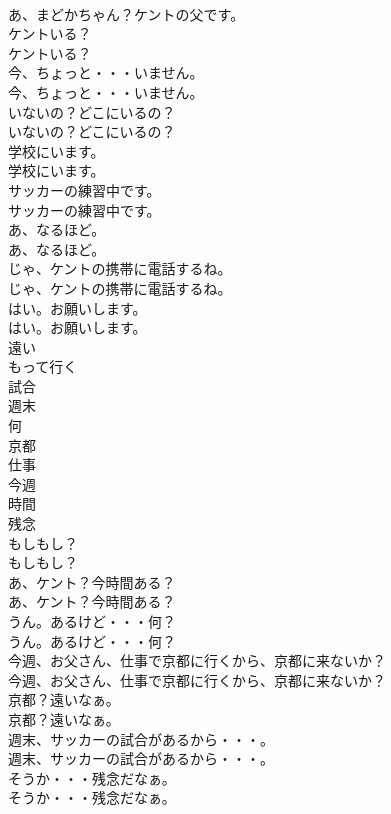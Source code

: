 \documentclass[8pt]{extreport}
\begin{document}
\begin{CJK}{UTF8}{min}
\\	あ、まどかちゃん？ケントの父です。 
\\	ケントいる？	
\\	ケントいる？ 
\\	今、ちょっと・・・いません。	
\\	今、ちょっと・・・いません。 
\\	いないの？どこにいるの？	
\\	いないの？どこにいるの？ 
\\	学校にいます。	
\\	学校にいます。 
\\	サッカーの練習中です。	
\\	サッカーの練習中です。 
\\	あ、なるほど。	
\\	あ、なるほど。 
\\	じゃ、ケントの携帯に電話するね。	
\\	じゃ、ケントの携帯に電話するね。 
\\	はい。お願いします。	
\\	はい。お願いします。 
\\	遠い
\\	もって行く
\\	試合
\\	週末
\\	何
\\	京都
\\	仕事
\\	今週
\\	時間
\\	残念
\\	もしもし？	
\\	もしもし？ 
\\	あ、ケント？今時間ある？	
\\	あ、ケント？今時間ある？ 
\\	うん。あるけど・・・何？	
\\	うん。あるけど・・・何？ 
\\	今週、お父さん、仕事で京都に行くから、京都に来ないか？	
\\	今週、お父さん、仕事で京都に行くから、京都に来ないか？ 
\\	京都？遠いなぁ。	
\\	京都？遠いなぁ。 
\\	週末、サッカーの試合があるから・・・。	
\\	週末、サッカーの試合があるから・・・。 
\\	そうか・・・残念だなぁ。	
\\	そうか・・・残念だなぁ。 

\end{CJK}
\end{document}
